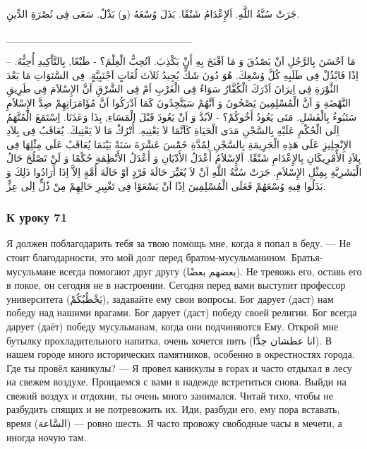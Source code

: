 \documentclass[a5paper]{article}
\begin{document}
جَرَتْ سُنَّةُ اللَّهِ. اَلإِعْدَامُ شَنْقًا. بَذَلَ وُسْعَهُ (و) بَذْلٌ. سَعَى فِى نُصْرَةِ الدِّينِ.

\_\_\_\_\_\_\_\_\_\_\_\_\_\_\_\_\_\_\_\_\_\_\_\_\_

مَا اَحْسَنَ بِالرَّجُلِ اَنْ يَصْدُقَ وَ مَا اَقْبَحَ بِهِ أَنْ يَكْذِبَ. اَتُحِبُّ الْعِلْمَ؟ - طَبْعًا, بِالتَّاْكِيدِ أُحِبُّهُ. – اِذًا فَابْذُلْ فِى طَلَبِهِ كُلَّ وُسْعِكَ. هُوَ دُونَ شَكٍّ يُجِيدُ ثَلاَثَ لُغَاتٍ اَجْنَبِيَّةٍ. فِى السَّنَوَاتِ مَا بَعْدَ الثَّوْرَةِ فِى اِيرَانَ اَدْرَكَ الْكُفَّارُ سَوَاءٌ فِى الْغَرْبِ اَمْ فِى الشَّرْقِ اَنَّ الإِسْلاَمَ فِى طَرِيقِ النَّهْضَةِ وَ اَنَّ الْمُسْلِمِينَ يَصْحُونَ وَ اَنَّهُمْ سَيَتَّحِدُونَ كَمَا اَدْرَكُوا اَنَّ مُؤَامَرَاتِهِمْ ضِدَّ الإِسْلاَمِ سَتَبُوءُ بِالْفَشَلِ. مَتَى يَعُودُ أَخُوكُمْ؟ - لاَبُدَّ وَ اَنْ يَعُودَ قَبْلَ الْمَسَاءِ, بِذَا وَعَدَنَا. اِسْتَمَعَ الْمُتَّهَمُ اِلَى الْحُكْمِ عَلَيْهِ بِالسَّجْنِ مَدَى الْحَيَاةِ كَاَنَّمَا لاَ يَعْنِيهِ. أُتْرُكْ مَا لاَ يَعْنِيكَ. يُعَاقَبُ فِى بِلاَدِ الإِنْجِلِيزِ عَلَى هَذِهِ الْجَرِيمَةِ بِالسَّجْنِ لِمُدَّةِ خَمْسَ عَشْرَةَ سَنَةً بَيْنَمَا يُعَاقَبُ عَلَى مِثْلِهَا فِى بِلاَدِ الأَمْرِيكَانِ بِالإِعْدَامِ شَنْقًا. اَلإِسْلاَمُ أَعْدَلُ الأَدْيَانِ وَ أَعْدَلُ الأَنْظِمَةِ حُكْمًا وَ لَنْ تَصْلُحَ حَالُ الْبَشَرِيَّةِ بِمِثْلِ الإِسْلاَمِ. جَرَتْ سُنَّةُ اللَّهِ اَنْ لاَ يُغَيِّرَ حَالَةَ فَرْدٍ اَوْ حَالَةَ أُمَّةٍ اِلاَّ اِذَا أَرَادُوا ذَلِكَ وَ بَذَلُوا فِيهِ وُسْعَهُمْ فَعَلَى الْمُسْلِمِينَ اِذًا اَنْ يَسْعَوْا فِى تَغْيِيرِ حَالِهِمْ مِنْ ذُلٍّ اِلَى عِزٍّ.

\subsubsection{К уроку 71}
Я должен поблагодарить тебя за твою помощь мне, когда я попал в беду. — Не стоит благодарности, это мой долг перед братом-мусуль­манином. Братья-мусульмане всегда помогают друг другу (بعضهم بعضًا). Не тревожь его, оставь его в покое, он сегодня не в настроении. Сегодня перед вами выступит профессор университета (يَخْطُبُكُمْ), задавайте ему свои вопросы. Бог дарует (даст) нам победу над нашими врагами. Бог дарует (даст) победу своей религии. Бог всегда дарует (даёт) победу мусульманам, когда они подчиняются Ему. Открой мне бутылку прохладительного напитка, очень хочется пить (انا عطشان جدًّا). В нашем городе много исторических памятников, особенно в окрестностях города. Где ты провёл каникулы? — Я провел каникулы в горах и часто отдыхал в лесу на свежем воздухе. Прощаемся с вами в надежде встретиться снова. Выйди на свежий воздух и отдохни, ты очень много занимался. Читай тихо, чтобы не разбудить спящих и не потревожить их. Иди, разбуди его, ему пора вставать, время (السَّاعة) — ровно шесть. Я часто провожу свободные часы в мечети, а иногда ночую там.
\end{document}
